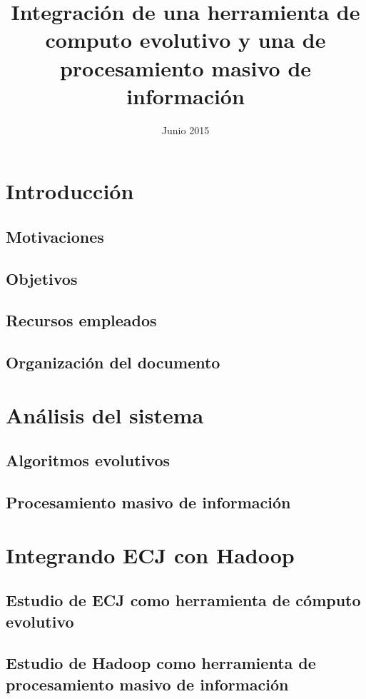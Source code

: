 \documentclass{estilos-y-libreria}
\title{Integración de una herramienta de computo evolutivo y una de procesamiento masivo de informaci\'on}
\date{Junio 2015}
\begin{document}
\frontmatter
\hacerportada
\hacercontraportada
\newpage{\ }
\thispagestyle{empty} 
\hacerprologo
\haceragradecimientos
\setcounter{secnumdepth}{2}
\setcounter{tocdepth}{2}
\tableofcontents
\listoffigures
\listoftables

\mainmatter

\chapter{Introducci\'on}
	\section{Motivaciones\label{motivaciones}}
		
	\section{Objetivos}
	\section{Recursos empleados}
	\section{Organizaci\'on del documento}

\chapter{An\'alisis del sistema}
	
	\section{Algoritmos evolutivos}
		
	\section{Procesamiento masivo de informaci\'on}
		

\chapter{Integrando ECJ con Hadoop}
	
	\section{Estudio de ECJ como herramienta de c\'omputo evolutivo\label{desarrollo-ecj}}
		
	\section{Estudio de Hadoop como herramienta de procesamiento masivo de informaci\'on\label{desarrollo-hadoop}}
		
\end{document}
